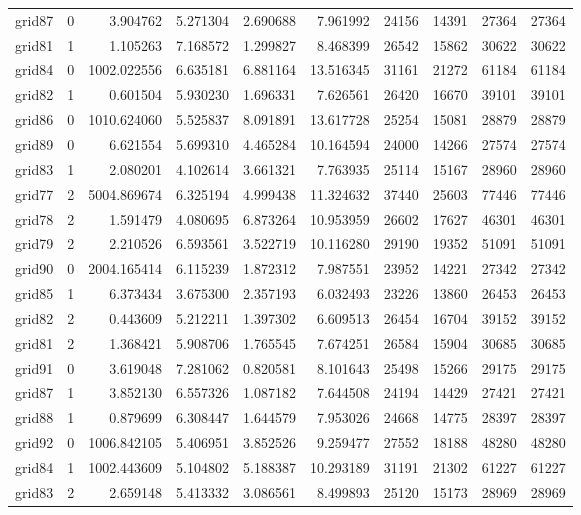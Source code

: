\begin{longtable}{|l|r|r|r|r|r|r|r|r|r|}
grid87 & 0 & 3.904762 & 5.271304 & 2.690688 & 7.961992 & 24156 & 14391 & 27364 & 27364 \\
grid81 & 1 & 1.105263 & 7.168572 & 1.299827 & 8.468399 & 26542 & 15862 & 30622 & 30622 \\
grid84 & 0 & 1002.022556 & 6.635181 & 6.881164 & 13.516345 & 31161 & 21272 & 61184 & 61184 \\
grid82 & 1 & 0.601504 & 5.930230 & 1.696331 & 7.626561 & 26420 & 16670 & 39101 & 39101 \\
grid86 & 0 & 1010.624060 & 5.525837 & 8.091891 & 13.617728 & 25254 & 15081 & 28879 & 28879 \\
grid89 & 0 & 6.621554 & 5.699310 & 4.465284 & 10.164594 & 24000 & 14266 & 27574 & 27574 \\
grid83 & 1 & 2.080201 & 4.102614 & 3.661321 & 7.763935 & 25114 & 15167 & 28960 & 28960 \\
grid77 & 2 & 5004.869674 & 6.325194 & 4.999438 & 11.324632 & 37440 & 25603 & 77446 & 77446 \\
grid78 & 2 & 1.591479 & 4.080695 & 6.873264 & 10.953959 & 26602 & 17627 & 46301 & 46301 \\
grid79 & 2 & 2.210526 & 6.593561 & 3.522719 & 10.116280 & 29190 & 19352 & 51091 & 51091 \\
grid90 & 0 & 2004.165414 & 6.115239 & 1.872312 & 7.987551 & 23952 & 14221 & 27342 & 27342 \\
grid85 & 1 & 6.373434 & 3.675300 & 2.357193 & 6.032493 & 23226 & 13860 & 26453 & 26453 \\
grid82 & 2 & 0.443609 & 5.212211 & 1.397302 & 6.609513 & 26454 & 16704 & 39152 & 39152 \\
grid81 & 2 & 1.368421 & 5.908706 & 1.765545 & 7.674251 & 26584 & 15904 & 30685 & 30685 \\
grid91 & 0 & 3.619048 & 7.281062 & 0.820581 & 8.101643 & 25498 & 15266 & 29175 & 29175 \\
grid87 & 1 & 3.852130 & 6.557326 & 1.087182 & 7.644508 & 24194 & 14429 & 27421 & 27421 \\
grid88 & 1 & 0.879699 & 6.308447 & 1.644579 & 7.953026 & 24668 & 14775 & 28397 & 28397 \\
grid92 & 0 & 1006.842105 & 5.406951 & 3.852526 & 9.259477 & 27552 & 18188 & 48280 & 48280 \\
grid84 & 1 & 1002.443609 & 5.104802 & 5.188387 & 10.293189 & 31191 & 21302 & 61227 & 61227 \\
grid83 & 2 & 2.659148 & 5.413332 & 3.086561 & 8.499893 & 25120 & 15173 & 28969 & 28969 \\

\end{longtable}
